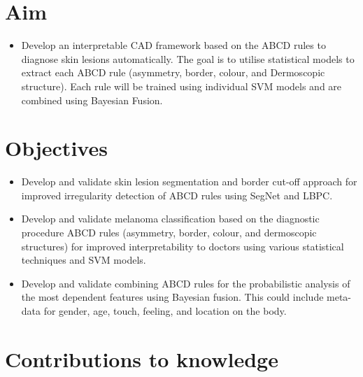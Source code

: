 \section{Aim}
\begin{itemize}
	\item Develop an interpretable CAD framework based on the ABCD rules to diagnose skin lesions automatically. The goal is to utilise statistical models to extract each ABCD rule (asymmetry, border, colour, and Dermoscopic structure). Each rule will be trained using individual SVM models and are combined using Bayesian Fusion.
\end{itemize}

\section{Objectives}
\begin{itemize}

	\item Develop and validate skin lesion segmentation and border cut-off approach for improved irregularity detection of ABCD rules using SegNet and LBPC.
	\item Develop and validate melanoma classification based on the diagnostic procedure ABCD rules (asymmetry, border, colour, and dermoscopic structures) for improved interpretability to doctors using various statistical techniques and SVM models.
	\item Develop and validate combining ABCD rules for the probabilistic analysis of the most dependent features using Bayesian fusion. This could include meta-data for gender, age, touch, feeling, and location on the body.

\end{itemize}

\section{Contributions to knowledge}
 

